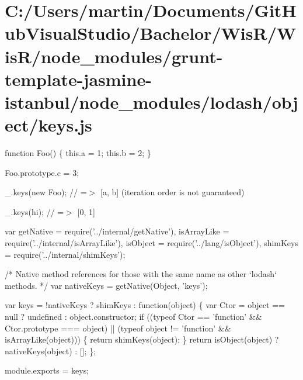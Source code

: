 \hypertarget{_c_1_2_users_2martin_2_documents_2_git_hub_visual_studio_2_bachelor_2_wis_r_2_wis_r_2node_module6dbd024f9fd2eba691cde173f91c59bb}{}\section{C\+:/\+Users/martin/\+Documents/\+Git\+Hub\+Visual\+Studio/\+Bachelor/\+Wis\+R/\+Wis\+R/node\+\_\+modules/grunt-\/template-\/jasmine-\/istanbul/node\+\_\+modules/lodash/object/keys.\+js}
function Foo() \{ this.\+a = 1; this.\+b = 2; \}

Foo.\+prototype.\+c = 3;

\+\_\+.\+keys(new Foo); // =$>$ \mbox{[}\textquotesingle{}a\textquotesingle{}, \textquotesingle{}b\textquotesingle{}\mbox{]} (iteration order is not guaranteed)

\+\_\+.\+keys(\textquotesingle{}hi\textquotesingle{}); // =$>$ \mbox{[}\textquotesingle{}0\textquotesingle{}, \textquotesingle{}1\textquotesingle{}\mbox{]}


\begin{DoxyCodeInclude}
var getNative = require(\textcolor{stringliteral}{'../internal/getNative'}),
    isArrayLike = require(\textcolor{stringliteral}{'../internal/isArrayLike'}),
    isObject = require(\textcolor{stringliteral}{'../lang/isObject'}),
    shimKeys = require(\textcolor{stringliteral}{'../internal/shimKeys'});

\textcolor{comment}{/* Native method references for those with the same name as other `lodash` methods. */}
var nativeKeys = getNative(Object, \textcolor{stringliteral}{'keys'});

var keys = !nativeKeys ? shimKeys : \textcolor{keyword}{function}(object) \{
  var Ctor = \textcolor{keywordtype}{object} == null ? undefined : \textcolor{keywordtype}{object}.constructor;
  \textcolor{keywordflow}{if} ((typeof Ctor == \textcolor{stringliteral}{'function'} && Ctor.prototype === \textcolor{keywordtype}{object}) ||
      (typeof \textcolor{keywordtype}{object} != \textcolor{stringliteral}{'function'} && isArrayLike(\textcolor{keywordtype}{object}))) \{
    \textcolor{keywordflow}{return} shimKeys(\textcolor{keywordtype}{object});
  \}
  \textcolor{keywordflow}{return} isObject(\textcolor{keywordtype}{object}) ? nativeKeys(\textcolor{keywordtype}{object}) : [];
\};

module.exports = keys;
\end{DoxyCodeInclude}
 